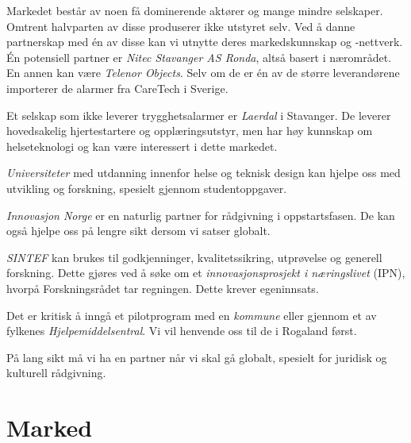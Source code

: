 
Markedet består av noen få dominerende aktører og mange mindre selskaper.
Omtrent halvparten av disse produserer ikke utstyret selv. Ved å danne
partnerskap med én av disse kan vi utnytte deres markedskunnskap og -nettverk.
Én potensiell partner er \textit{Nitec Stavanger AS Ronda}, altså basert i
nærområdet.  En annen kan være \textit{Telenor Objects}. Selv om de er én av de
større leverandørene importerer de alarmer fra CareTech i Sverige.

Et selskap som ikke leverer trygghetsalarmer er \textit{Laerdal} i Stavanger.
De leverer hovedsakelig hjertestartere og opplæringsutstyr, men har høy
kunnskap om helseteknologi og kan være interessert i dette markedet.

\textit{Universiteter} med utdanning innenfor helse og teknisk design kan
hjelpe oss med utvikling og forskning, spesielt gjennom studentoppgaver.

\textit{Innovasjon Norge} er en naturlig partner for rådgivning i
oppstartsfasen. De kan også hjelpe oss på lengre sikt dersom vi satser globalt.

\textit{SINTEF} kan brukes til godkjenninger, kvalitetssikring, utprøvelse og
generell forskning. Dette gjøres ved å søke om et \textit{innovasjonsprosjekt i
næringslivet} (IPN), hvorpå Forskningsrådet tar regningen. Dette krever
egeninnsats.

Det er kritisk å inngå et pilotprogram med en \textit{kommune} eller gjennom et av
fylkenes \textit{Hjelpemiddelsentral}. Vi vil henvende oss til de i Rogaland først.

På lang sikt må vi ha en partner når vi skal gå globalt, spesielt for juridisk
og kulturell rådgivning.

\clearpage
\section{Marked}



